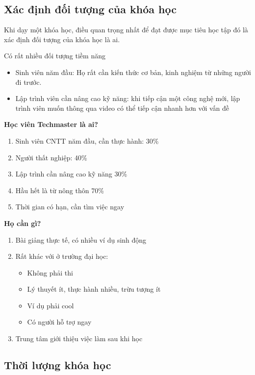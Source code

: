 \subsection{Xác định đối tượng của khóa học}

Khi dạy một khóa học, điều quan trọng nhất để đạt được mục tiêu học tập đó là xác định đối tượng của khóa học là ai.

Có rất nhiều đối tượng tiềm năng

\begin{itemize}
  \item Sinh viên năm đầu: Họ rất cần kiến thức cơ bản, kinh nghiệm từ những người đi trước.
  \item Lập trình viên cần nâng cao kỹ năng: khi tiếp cận một công nghệ mới, lập trình viên muốn thông qua video có thể tiếp cận nhanh hơn với vấn đề
\end{itemize}

\textbf{Học viên Techmaster là ai?}

\begin{enumerate}
  \item Sinh viên CNTT năm đầu, cần thực hành: 30\%
  \item Người thất nghiệp: 40\%
  \item Lập trình cần nâng cao kỹ năng 30\%
  \item Hầu hết là từ nông thôn 70\%
  \item Thời gian có hạn, cần tìm việc ngay
\end{enumerate}

\textbf{Họ cần gì?}

\begin{enumerate}
  \item Bài giảng thực tế, có nhiều ví dụ sinh động
  \item Rất khác với ở trường đại học:
  \begin{itemize}
    \item Không phải thi
    \item Lý thuyết ít, thực hành nhiều, trừu tượng ít
    \item Ví dụ phải cool
    \item Có người hỗ trợ ngay
  \end{itemize}
  \item Trung tâm giới thiệu việc làm sau khi học
\end{enumerate}

\subsection{Thời lượng khóa học}

